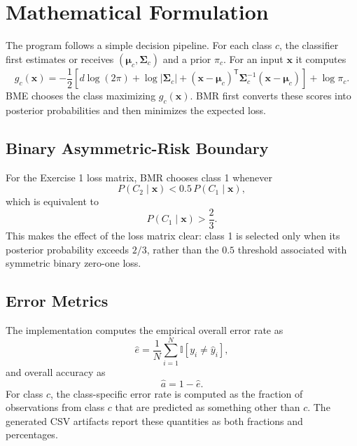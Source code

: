 \documentclass[11pt,a4paper]{article}
\begin{document}
\section{Mathematical Formulation}
The program follows a simple decision pipeline. For each class $c$, the classifier first estimates or receives $(\boldsymbol{\mu}_c,\boldsymbol{\Sigma}_c)$ and a prior $\pi_c$. For an input $\mathbf{x}$ it computes
\begin{equation}
g_c(\mathbf{x})
=
-\frac{1}{2}
\left[
 d\log(2\pi)
+\log|\boldsymbol{\Sigma}_c|
+
(\mathbf{x}-\boldsymbol{\mu}_c)^{\mathsf T}
\boldsymbol{\Sigma}_c^{-1}
(\mathbf{x}-\boldsymbol{\mu}_c)
\right]
+\log\pi_c.
\end{equation}
BME chooses the class maximizing $g_c(\mathbf{x})$. BMR first converts these scores into posterior probabilities and then minimizes the expected loss.

\subsection{Binary Asymmetric-Risk Boundary}
For the Exercise 1 loss matrix, BMR chooses class 1 whenever
\begin{equation}
P(C_2\mid\mathbf{x})
<
0.5\,P(C_1\mid\mathbf{x}),
\end{equation}
which is equivalent to
\begin{equation}
P(C_1\mid\mathbf{x})
>
\frac{2}{3}.
\end{equation}
This makes the effect of the loss matrix clear: class 1 is selected only when its posterior probability exceeds $2/3$, rather than the $0.5$ threshold associated with symmetric binary zero-one loss.

\subsection{Error Metrics}
The implementation computes the empirical overall error rate as
\begin{equation}
\widehat{e}
=
\frac{1}{N}
\sum_{i=1}^{N}
\mathbb{I}[y_i\neq\widehat{y}_i],
\end{equation}
and overall accuracy as
\begin{equation}
\widehat{a}
=
1-\widehat{e}.
\end{equation}
For class $c$, the class-specific error rate is computed as the fraction of observations from class $c$ that are predicted as something other than $c$. The generated CSV artifacts report these quantities as both fractions and percentages.
\end{document}
